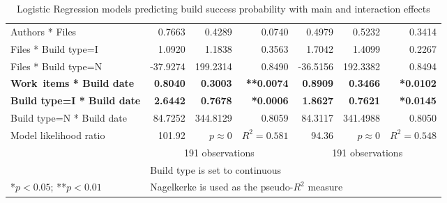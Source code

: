 \begin{table}
\begin{center}
\begin{tabular}{l|rrr|rrr}
Authors * Files             &   0.7663 &   0.4289 & 0.0740 &    0.4979 &    0.5232 &   0.3414 \\
Files * Build type=I              &   1.0920 &   1.1838 & 0.3563 &    1.7042 &    1.4099 &   0.2267 \\
Files * Build type=N              & -37.9274 & 199.2314 & 0.8490 &  -36.5156 &  192.3382 &   0.8494 \\
\textbf{Work~items * Build date}       &   \textbf{0.8040} &   \textbf{0.3003} & \textbf{**0.0074} &    \textbf{0.8909} &    \textbf{0.3466} &   \textbf{*0.0102} \\
\textbf{Build type=I * Build date}          &   \textbf{2.6442} &   \textbf{0.7678} & \textbf{*0.0006} &    \textbf{1.8627} &    \textbf{0.7621} &   \textbf{*0.0145} \\
Build type=N * Build date          &  84.7252 & 344.8129 & 0.8059 &   84.3117 &  341.4988 &   0.8050 \\
	\hline
Model likelihood ratio & 101.92 & $p \approx 0$ & $R^2=0.581$ & 94.36 & $p \approx 0$ &	$R^2 = 0.548$ \\
& \multicolumn{3}{c}{191 observations} & \multicolumn{3}{c}{191 observations} \\
\multicolumn{1}{l}{ } & \multicolumn{6}{l}{\scriptsize{Build type is set to continuous}} \\
\multicolumn{1}{l}{\scriptsize{*$p < 0.05$; **$p < 0.01$}} & \multicolumn{6}{l}{\scriptsize{Nagelkerke is used as the pseudo-$R^2$ measure}}
\end{tabular}
\end{center}
\caption{Logistic Regression models predicting build success probability with main and interaction effects}
\label{tab:logr}
\end{table}


